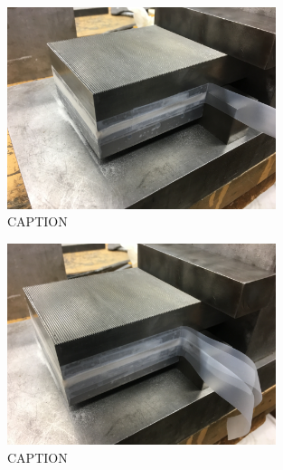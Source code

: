 \begin{figure}
	\centering
        \includegraphics[width=0.7\textwidth]{appendix_sample_prep/dds_one_strip_tape.jpg}
   	\caption{CAPTION}
  	\label{Fig:dds_one_strip_tape}
\end{figure}

\clearpage

\begin{figure}
	\centering
        \includegraphics[width=0.7\textwidth]{appendix_sample_prep/dds_three_strip_tape.jpg}
   	\caption{CAPTION}
  	\label{Fig:dds_three_srtip_tape}
\end{figure}

